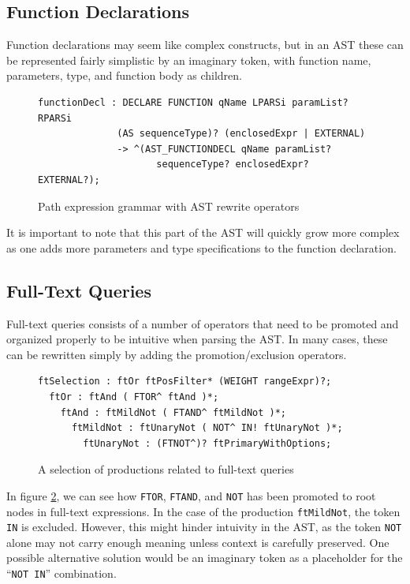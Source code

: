\subsection{Function Declarations}
Function declarations may seem like complex constructs, but in an AST these can
be represented fairly simplistic by an imaginary token, with function name, 
parameters, type, and function body as children.

\begin{figure}[h!]
\begin{Verbatim} 
functionDecl : DECLARE FUNCTION qName LPARSi paramList? RPARSi 
              (AS sequenceType)? (enclosedExpr | EXTERNAL)
              -> ^(AST_FUNCTIONDECL qName paramList? 
                     sequenceType? enclosedExpr? EXTERNAL?);
\end{Verbatim}
\caption{Path expression grammar with AST rewrite operators}
\label{code:ast:funcdecl1}
\end{figure}

It is important to note that this part of the AST will quickly grow more complex
as one adds more parameters and type specifications to the function declaration.

\subsection{Full-Text Queries}
Full-text queries consists of a number of operators that need to be promoted and
organized properly to be intuitive when parsing the AST. In many cases, these
can be rewritten simply by adding the promotion/exclusion operators. 

\begin{figure}[h!]
\begin{Verbatim} 
ftSelection : ftOr ftPosFilter* (WEIGHT rangeExpr)?;
  ftOr : ftAnd ( FTOR^ ftAnd )*;
    ftAnd : ftMildNot ( FTAND^ ftMildNot )*;
      ftMildNot : ftUnaryNot ( NOT^ IN! ftUnaryNot )*;
        ftUnaryNot : (FTNOT^)? ftPrimaryWithOptions;
\end{Verbatim}
\caption{A selection of productions related to full-text queries}
\label{code:ast:ft_op}
\end{figure}

In figure \ref{code:ast:ft_op}, we can see how \verb!FTOR!, \verb!FTAND!, and \verb!NOT! 
has been promoted to root nodes in full-text expressions. In the case of the
production \verb!ftMildNot!, the token \verb!IN! is excluded. However, this
might hinder intuivity in the AST, as the token \verb!NOT! alone may not carry
enough meaning unless context is carefully preserved. One possible alternative
solution would be an imaginary token as a placeholder for the ``\verb!NOT IN!''
combination. 
